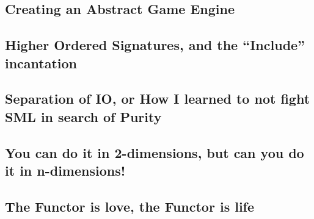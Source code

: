 \documentclass[9pt,letterpaper]{extarticle}
\begin{document}
  \subsection{Creating an Abstract Game Engine}
  \subsection{Higher Ordered Signatures, and the ``Include'' incantation}
  \subsection{Separation of IO, or How I learned to not fight SML in search of Purity}
  \subsection{You can do it in 2-dimensions, but can you do it in n-dimensions!}
  \subsection{The Functor is love, the Functor is life}
\end{document}
